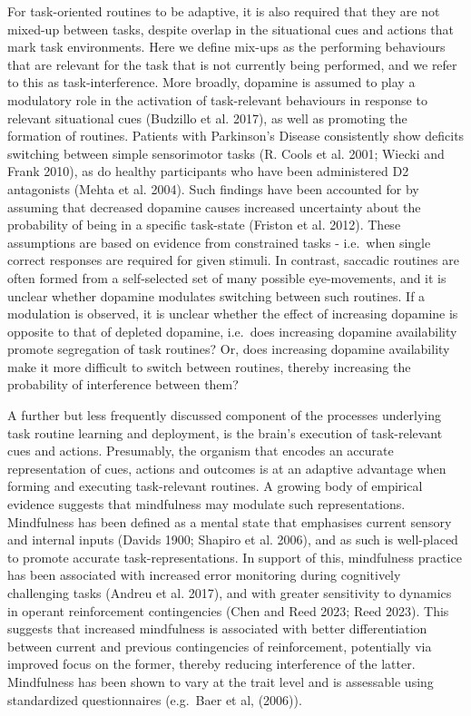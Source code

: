 \documentclass{article}
\begin{document}
For task-oriented routines to be adaptive, it is also required that they
are not mixed-up between tasks, despite overlap in the situational cues
and actions that mark task environments. Here we define mix-ups as the
performing behaviours that are relevant for the task that is not
currently being performed, and we refer to this as task-interference.
More broadly, dopamine is assumed to play a modulatory role in the
activation of task-relevant behaviours in response to relevant
situational cues (Budzillo et al. 2017), as well as promoting the
formation of routines. Patients with Parkinson's Disease consistently
show deficits switching between simple sensorimotor tasks (R. Cools et
al. 2001; Wiecki and Frank 2010), as do healthy participants who have
been administered D2 antagonists (Mehta et al. 2004). Such findings have
been accounted for by assuming that decreased dopamine causes increased
uncertainty about the probability of being in a specific task-state
(Friston et al. 2012). These assumptions are based on evidence from
constrained tasks - i.e.~when single correct responses are required for
given stimuli. In contrast, saccadic routines are often formed from a
self-selected set of many possible eye-movements, and it is unclear
whether dopamine modulates switching between such routines. If a
modulation is observed, it is unclear whether the effect of increasing
dopamine is opposite to that of depleted dopamine, i.e.~does increasing
dopamine availability promote segregation of task routines? Or, does
increasing dopamine availability make it more difficult to switch
between routines, thereby increasing the probability of interference
between them?

A further but less frequently discussed component of the processes
underlying task routine learning and deployment, is the brain's
execution of task-relevant cues and actions. Presumably, the organism
that encodes an accurate representation of cues, actions and outcomes is
at an adaptive advantage when forming and executing task-relevant
routines. A growing body of empirical evidence suggests that mindfulness
may modulate such representations. Mindfulness has been defined as a
mental state that emphasises current sensory and internal inputs (Davids
1900; Shapiro et al. 2006), and as such is well-placed to promote
accurate task-representations. In support of this, mindfulness practice
has been associated with increased error monitoring during cognitively
challenging tasks (Andreu et al. 2017), and with greater sensitivity to
dynamics in operant reinforcement contingencies (Chen and Reed 2023;
Reed 2023). This suggests that increased mindfulness is associated with
better differentiation between current and previous contingencies of
reinforcement, potentially via improved focus on the former, thereby
reducing interference of the latter. Mindfulness has been shown to vary
at the trait level and is assessable using standardized questionnaires
(e.g.~Baer et al, (2006)).
\end{document}
